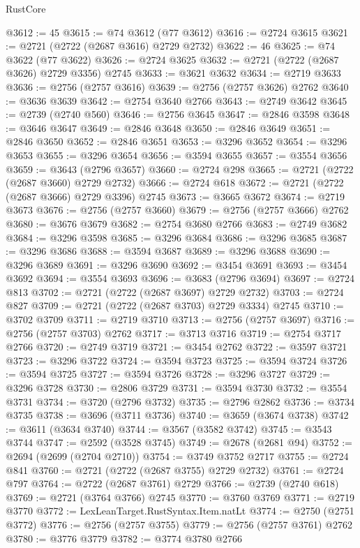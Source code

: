 \begin{lexlean}{RustCore}
\begin{coremodule}
@3612 := 45
@3615 := @74 @3612 (@77 @3612)
@3616 := @2724 @3615
@3621 := @2721 (@2722 (@2687 @3616) @2729 @2732)
@3622 := 46
@3625 := @74 @3622 (@77 @3622)
@3626 := @2724 @3625
@3632 := @2721 (@2722 (@2687 @3626) @2729 @3356) @2745
@3633 := @3621 @3632
@3634 := @2719 @3633
@3636 := @2756 (@2757 @3616)
@3639 := @2756 (@2757 @3626) @2762
@3640 := @3636 @3639
@3642 := @2754 @3640 @2766
@3643 := @2749 @3642
@3645 := @2739 (@2740 @560)
@3646 := @2756 @3645
@3647 := @2846 @3598
@3648 := @3646 @3647
@3649 := @2846 @3648
@3650 := @2846 @3649
@3651 := @2846 @3650
@3652 := @2846 @3651
@3653 := @3296 @3652
@3654 := @3296 @3653
@3655 := @3296 @3654
@3656 := @3594 @3655
@3657 := @3554 @3656
@3659 := @3643 (@2796 @3657)
@3660 := @2724 @298
@3665 := @2721 (@2722 (@2687 @3660) @2729 @2732)
@3666 := @2724 @618
@3672 := @2721 (@2722 (@2687 @3666) @2729 @3396) @2745
@3673 := @3665 @3672
@3674 := @2719 @3673
@3676 := @2756 (@2757 @3660)
@3679 := @2756 (@2757 @3666) @2762
@3680 := @3676 @3679
@3682 := @2754 @3680 @2766
@3683 := @2749 @3682
@3684 := @3296 @3598
@3685 := @3296 @3684
@3686 := @3296 @3685
@3687 := @3296 @3686
@3688 := @3594 @3687
@3689 := @3296 @3688
@3690 := @3296 @3689
@3691 := @3296 @3690
@3692 := @3454 @3691
@3693 := @3454 @3692
@3694 := @3554 @3693
@3696 := @3683 (@2796 @3694)
@3697 := @2724 @813
@3702 := @2721 (@2722 (@2687 @3697) @2729 @2732)
@3703 := @2724 @827
@3709 := @2721 (@2722 (@2687 @3703) @2729 @3334) @2745
@3710 := @3702 @3709
@3711 := @2719 @3710
@3713 := @2756 (@2757 @3697)
@3716 := @2756 (@2757 @3703) @2762
@3717 := @3713 @3716
@3719 := @2754 @3717 @2766
@3720 := @2749 @3719
@3721 := @3454 @2762
@3722 := @3597 @3721
@3723 := @3296 @3722
@3724 := @3594 @3723
@3725 := @3594 @3724
@3726 := @3594 @3725
@3727 := @3594 @3726
@3728 := @3296 @3727
@3729 := @3296 @3728
@3730 := @2806 @3729
@3731 := @3594 @3730
@3732 := @3554 @3731
@3734 := @3720 (@2796 @3732)
@3735 := @2796 @2862
@3736 := @3734 @3735
@3738 := @3696 (@3711 @3736)
@3740 := @3659 (@3674 @3738)
@3742 := @3611 (@3634 @3740)
@3744 := @3567 (@3582 @3742)
@3745 := @3543 @3744
@3747 := @2592 (@3528 @3745)
@3749 := @2678 (@2681 @94)
@3752 := @2694 (@2699 (@2704 @2710))
@3754 := @3749 @3752 @2717
@3755 := @2724 @841
@3760 := @2721 (@2722 (@2687 @3755) @2729 @2732)
@3761 := @2724 @797
@3764 := @2722 (@2687 @3761) @2729
@3766 := @2739 (@2740 @618)
@3769 := @2721 (@3764 @3766) @2745
@3770 := @3760 @3769
@3771 := @2719 @3770
@3772 := LexLeanTarget.RustSyntax.Item.natLt
@3774 := @2750 (@2751 @3772)
@3776 := @2756 (@2757 @3755)
@3779 := @2756 (@2757 @3761) @2762
@3780 := @3776 @3779
@3782 := @3774 @3780 @2766

\end{coremodule}
\end{lexlean}
